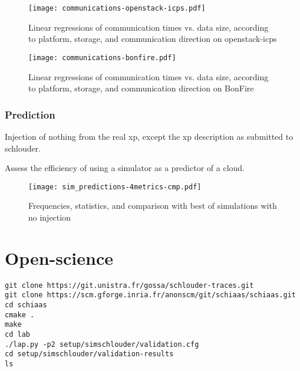 \documentclass[parallelisme]{compas2017}
\newcommand\vrpath{../../lab/setup/simschlouder/validation-results/}
\begin{document}
\begin{figure}
  \centering
  \texttt{[image: communications-openstack-icps.pdf]}
  
  \caption{Linear regressions of communication times vs. data size, 
    according to platform, storage, and communication direction on openstack-icps}
\end{figure} 


\begin{figure}
  \centering
  \texttt{[image: communications-bonfire.pdf]}
  
  \caption{Linear regressions of communication times vs. data size, 
    according to platform, storage, and communication direction on BonFire}
\end{figure} 


\subsubsection{Prediction}

Injection of nothing from the real xp, except the xp description as submitted 
to schlouder.

Assess the efficiency of using a simulator as a predictor of a cloud.

\begin{figure}
  \centering
  \texttt{[image: sim\_predictions-4metrics-cmp.pdf]}
  
  

  

  

  
  \caption{Frequencies, statistics, and comparison with best of simulations with no injection}
\end{figure} 

\section{Open-science}

\begin{verbatim}
git clone https://git.unistra.fr/gossa/schlouder-traces.git
git clone https://scm.gforge.inria.fr/anonscm/git/schiaas/schiaas.git 
cd schiaas
cmake .
make
cd lab
./lap.py -p2 setup/simschlouder/validation.cfg
cd setup/simschlouder/validation-results
ls
\end{verbatim}



\end{document}
